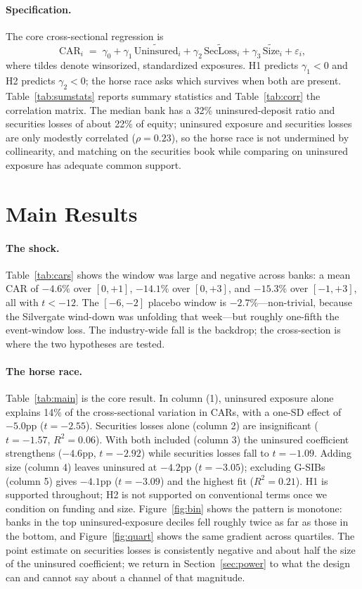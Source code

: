 \documentclass[12pt]{article}
\begin{document}
\paragraph{Specification.} The core cross-sectional regression is
\begin{equation}
\text{CAR}_i \;=\; \gamma_0 + \gamma_1\,\widetilde{\text{Uninsured}}_i
+ \gamma_2\,\widetilde{\text{SecLoss}}_i + \gamma_3\,\widetilde{\text{Size}}_i
+ \varepsilon_i,
\label{eq:xsec}
\end{equation}
where tildes denote winsorized, standardized exposures. H1 predicts $\gamma_1<0$ and H2
predicts $\gamma_2<0$; the horse race asks which survives when both are present.
Table~\ref{tab:sumstats} reports summary statistics and Table~\ref{tab:corr} the correlation
matrix. The median bank has a 32\% uninsured-deposit ratio and securities losses of about
22\% of equity; uninsured exposure and securities losses are only modestly correlated
($\rho=0.23$), so the horse race is not undermined by collinearity, and matching on the
securities book while comparing on uninsured exposure has adequate common support.

\section{Main Results}\label{sec:res}
\paragraph{The shock.} Table~\ref{tab:cars} shows the window was large and negative across
banks: a mean CAR of $-4.6\%$ over $[0,+1]$, $-14.1\%$ over $[0,+3]$, and $-15.3\%$ over
$[-1,+3]$, all with $t<-12$. The $[-6,-2]$ placebo window is $-2.7\%$---non-trivial, because
the Silvergate wind-down was unfolding that week---but roughly one-fifth the event-window
loss. The industry-wide fall is the backdrop; the cross-section is where the two hypotheses
are tested.

\paragraph{The horse race.} Table~\ref{tab:main} is the core result. In column (1),
uninsured exposure alone explains 14\% of the cross-sectional variation in CARs, with a
one-SD effect of $-5.0$pp ($t=-2.55$). Securities losses alone (column 2) are insignificant
($t=-1.57$, $R^2=0.06$). With both included (column 3) the uninsured coefficient
strengthens ($-4.6$pp, $t=-2.92$) while securities losses fall to $t=-1.09$. Adding size
(column 4) leaves uninsured at $-4.2$pp ($t=-3.05$); excluding G-SIBs (column 5) gives
$-4.1$pp ($t=-3.09$) and the highest fit ($R^2=0.21$). H1 is supported throughout; H2 is
not supported on conventional terms once we condition on funding and size.
Figure~\ref{fig:bin} shows the pattern is monotone: banks in the top uninsured-exposure
deciles fell roughly twice as far as those in the bottom, and Figure~\ref{fig:quart} shows
the same gradient across quartiles. The point estimate on securities losses is consistently
negative and about half the size of the uninsured coefficient; we return in
Section~\ref{sec:power} to what the design can and cannot say about a channel of that
magnitude.
\end{document}
